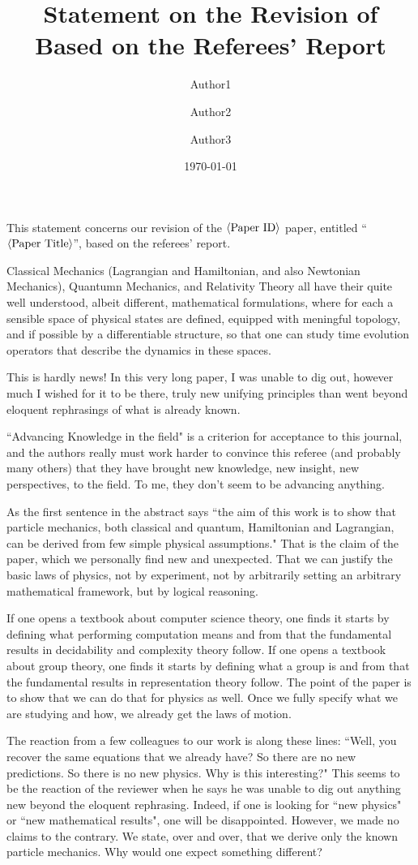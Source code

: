 \documentclass[10pt]{article}
\title{Statement on the Revision of \meta{Paper ID} \\
  Based on the Referees' Report}
\author{Author1 \and Author2 \and Author3}
\date{\today}
\newcommand\meta[1]{$\langle\hbox{#1}\rangle$}
\newcommand\PaperTitle[1]{``\textit{#1}''}
\begin{document}
This statement concerns our revision of the \meta{Paper ID} paper,
entitled \PaperTitle{\meta{Paper Title}}, based on the referees'
report.



\begin{response}{Classical Mechanics (Lagrangian and Hamiltonian, and also Newtonian Mechanics), Quantumn Mechanics, and Relativity Theory all have their quite well understood, albeit different, mathematical formulations, where for each a sensible space of physical states are defined, equipped with meningful topology, and if possible by a differentiable structure, so that one can study time evolution operators that describe the dynamics in these spaces. 
		
		This is hardly news! In this very long paper, I was unable to dig out,  however much I wished for it to be there, truly new unifying principles than went beyond eloquent rephrasings of what is already known.  
		
		``Advancing Knowledge in the field" is a criterion for acceptance to this journal, and the authors really must work harder to convince this referee (and probably many others) that they have brought new knowledge, new insight, new perspectives, to the field. To me, they don't seem to be advancing anything.  }
	
As the first sentence in the abstract says ``the aim of this work is to show that particle mechanics, both classical and quantum, Hamiltonian and Lagrangian, can be derived from few simple physical assumptions." That is the claim of the paper, which we personally find new and unexpected. That we can justify the basic laws of physics, not by experiment, not by arbitrarily setting an arbitrary mathematical framework, but by logical reasoning.

If one opens a textbook about computer science theory, one finds it starts by defining what performing computation means and from that the fundamental results in decidability and complexity theory follow. If one opens a textbook about group theory, one finds it starts by defining what a group is and from that the fundamental results in representation theory follow. The point of the paper is to show that we can do that for physics as well. Once we fully specify what we are studying and how, we already get the laws of motion.

The reaction from a few colleagues to our work is along these lines: ``Well, you recover the same equations that we already have? So there are no new predictions. So there is no new physics. Why is this interesting?" This seems to be the reaction of the reviewer when he says he was unable to dig out anything new beyond the eloquent rephrasing. Indeed, if one is looking for ``new physics" or ``new mathematical results", one will be disappointed. However, we made no claims to the contrary. We state, over and over, that we derive only the known particle mechanics. Why would one expect something different?


\end{response}
\end{document}
